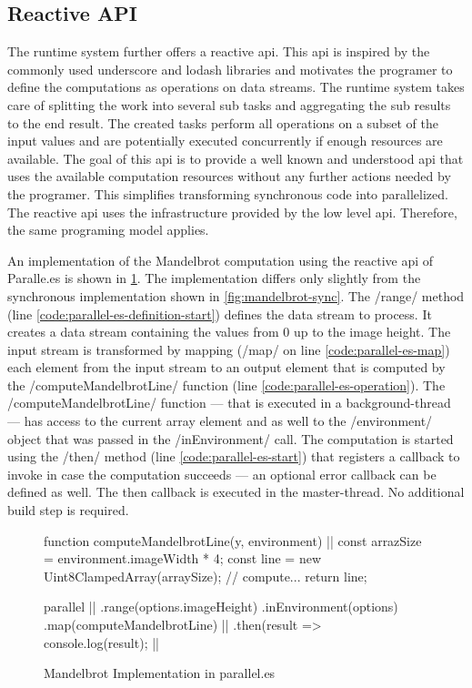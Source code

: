 \subsection{Reactive API}
The runtime system further offers a reactive api. This api is inspired by the commonly used underscore and lodash libraries and motivates the programer to define the computations as operations on data streams. The runtime system takes care of splitting the work into several sub tasks and aggregating the sub results to the end result. The created tasks perform all operations on a subset of the input values and are potentially executed concurrently if enough resources are available. The goal of this api is to provide a well known and understood api that uses the available computation resources without any further actions needed by the programer. This simplifies transforming synchronous code into parallelized. The reactive api uses the infrastructure provided by the low level api. Therefore, the same programing model applies.


 An implementation of the Mandelbrot computation using the reactive api of Paralle.es is shown in \cref{code:mandelbrot-parallel.es}. The implementation differs only slightly from the synchronous implementation shown in \cref{fig:mandelbrot-sync}. The \javascriptinline/range/ method (line \ref{code:parallel-es-definition-start}) defines the data stream to process. It creates a data stream containing the values from 0 up to the image height. The input stream is transformed by mapping (\javascriptinline/map/ on line \ref{code:parallel-es-map}) each element from the input stream to an output element that is computed by the \javascriptinline/computeMandelbrotLine/ function (line \ref{code:parallel-es-operation}). The \javascriptinline/computeMandelbrotLine/ function --- that is executed in a background-thread --- has access to the current array element and as well to the \javascriptinline/environment/ object that was passed in the \javascriptinline/inEnvironment/ call. The computation is started using the \javascriptinline/then/ method (line \ref{code:parallel-es-start}) that registers a callback to invoke in case the computation succeeds --- an optional error callback can be defined as well. The then callback is executed in the master-thread.  No additional build step is required.

\begin{figure}
	\begin{javascriptcode}
function computeMandelbrotLine(y, environment) { |$\label{code:parallel-es-operation}$|
	const arrazSize = environment.imageWidth * 4;
	const line = new Uint8ClampedArray(arraySize);
	// compute...
	return line;
}

parallel      |$\label{code:parallel-es-definition-start}$|
	.range(options.imageHeight)
	.inEnvironment(options)
	.map(computeMandelbrotLine) |$\label{code:parallel-es-map}$|
	.then(result => console.log(result); |$\label{code:parallel-es-start}$|
	\end{javascriptcode}
	
	\caption{Mandelbrot Implementation in parallel.es}
	\label{code:mandelbrot-parallel.es}
\end{figure}

